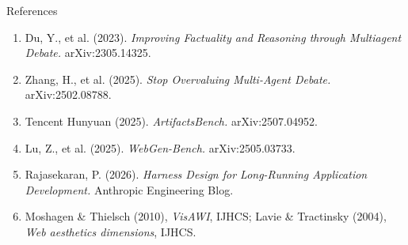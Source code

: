 \documentclass[aspectratio=169,10pt]{beamer}
\begin{document}
\begin{frame}{References}
    \vspace{0.4cm}
    \footnotesize
    \begin{enumerate}
        \setlength{\itemsep}{0.3cm}
        \item Du, Y., et al. (2023). \textit{Improving Factuality and Reasoning
              through Multiagent Debate.} arXiv:2305.14325.
        \item Zhang, H., et al. (2025). \textit{Stop Overvaluing Multi-Agent
              Debate.} arXiv:2502.08788.
        \item Tencent Hunyuan (2025). \textit{ArtifactsBench.} arXiv:2507.04952.
        \item Lu, Z., et al. (2025). \textit{WebGen-Bench.} arXiv:2505.03733.
        \item Rajasekaran, P. (2026). \textit{Harness Design for Long-Running
              Application Development.} Anthropic Engineering Blog.
        \item Moshagen \& Thielsch (2010), \textit{VisAWI}, IJHCS; \quad
              Lavie \& Tractinsky (2004), \textit{Web aesthetics dimensions},
              IJHCS.
    \end{enumerate}
\end{frame}
\end{document}
